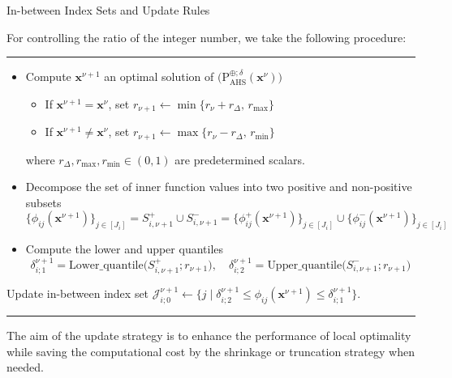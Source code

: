 \documentclass[aspectratio=169,xcolor=dvipsnames]{beamer}
\begin{document}
\begin{frame}{In-between Index Sets and Update Rules}
  \footnotesize
  \setlength{\abovedisplayskip}{2pt}
  \setlength{\belowdisplayskip}{2pt}

  For controlling the ratio of the integer number, we take the following
  procedure:

  \vspace{-0.02cm}
  {\color{MediumBlack}\rule{\linewidth}{0.4pt}}

  \begin{itemize}
    \setlength{\itemsep}{0.03cm}
    \item[--] Compute $\mathbf{x}^{\nu+1}$ an optimal solution of
      $\bigl(\mathrm{P}^{\oplus;\delta}_{\mathrm{AHS}}(\mathbf{x}^\nu)\bigr)$
      \begin{itemize}
        \setlength{\itemsep}{0.01cm}
        \item[--] If $\mathbf{x}^{\nu+1}=\mathbf{x}^\nu$, set
          $r_{\nu+1}\leftarrow\min\{r_\nu+r_\Delta,\,r_{\max}\}$
        \item[--] If $\mathbf{x}^{\nu+1}\neq\mathbf{x}^\nu$, set
          $r_{\nu+1}\leftarrow\max\{r_\nu-r_\Delta,\,r_{\min}\}$
      \end{itemize}
      where $r_\Delta,r_{\max},r_{\min}\in(0,1)$ are predetermined scalars.
    \item[--] Decompose the set of inner function values into two positive and
      non-positive subsets
      \[
        \{\phi_{ij}(\mathbf{x}^{\nu+1})\}_{j\in[J_i]}
        =S^+_{i,\nu+1}\cup S^-_{i,\nu+1}
        =\{\phi^+_{ij}(\mathbf{x}^{\nu+1})\}_{j\in[J_i]}\cup
         \{\phi^-_{ij}(\mathbf{x}^{\nu+1})\}_{j\in[J_i]}
      \]
    \item[--] Compute the lower and upper quantiles
      \[
        \delta^{\nu+1}_{i;1}
          =\text{Lower\_quantile}\bigl(S^+_{i,\nu+1};r_{\nu+1}\bigr),\quad
        \delta^{\nu+1}_{i;2}
          =\text{Upper\_quantile}\bigl(S^-_{i,\nu+1};r_{\nu+1}\bigr)
      \]
  \end{itemize}

  Update in-between index set\quad
  $\mathcal{J}^{\nu+1}_{i;0}\leftarrow
   \bigl\{j\mid\delta^{\nu+1}_{i;2}\leq\phi_{ij}(\mathbf{x}^{\nu+1})\leq
   \delta^{\nu+1}_{i;1}\bigr\}.$

  \vspace{0.02cm}
  {\color{MediumBlack}\rule{\linewidth}{0.4pt}}

  \vspace{0.02cm}
  The aim of the update strategy is to enhance the performance of local
  optimality while saving the computational cost by the shrinkage or truncation
  strategy when needed.
\end{frame}
\end{document}
